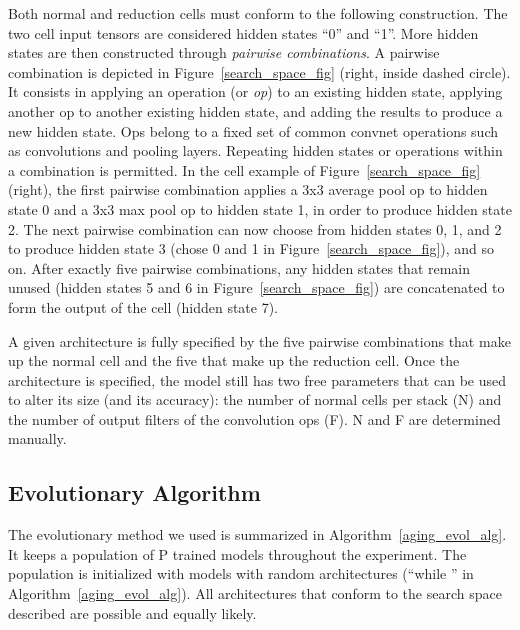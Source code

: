\documentclass[letterpaper]{article} \usepackage{aaai19}  \usepackage{times}  \usepackage{helvet}  \usepackage{courier}  \usepackage{graphicx}  \frenchspacing
\begin{document}
Both normal and reduction cells must conform to the following construction. The two cell input tensors are considered hidden states ``0'' and ``1''. More hidden states are then constructed through \textit{pairwise combinations}. A pairwise combination is depicted in Figure~\ref{search_space_fig} (right, inside dashed circle). It consists in applying an operation (or \textit{op}) to an existing hidden state, applying another op to another existing hidden state, and adding the results to produce a new hidden state. Ops belong to a fixed set of common convnet operations such as convolutions and pooling layers. Repeating hidden states or operations within a combination is permitted. In the cell example of Figure~\ref{search_space_fig} (right), the first pairwise combination applies a 3x3 average pool op to hidden state 0 and a 3x3 max pool op to hidden state 1, in order to produce hidden state 2. The next pairwise combination can now choose from hidden states 0, 1, and 2 to produce hidden state 3 (chose 0 and 1 in Figure~\ref{search_space_fig}), and so on. After exactly five pairwise combinations, any hidden states that remain unused (hidden states 5 and 6 in Figure~\ref{search_space_fig}) are concatenated to form the output of the cell (hidden state 7).

A given architecture is fully specified by the five pairwise combinations that make up the normal cell and the five that make up the reduction cell. Once the architecture is specified, the model still has two free parameters that can be used to alter its size (and its accuracy): the number of normal cells per stack (N) and the number of output filters of the convolution ops (F). N and F are determined manually.


\subsection{Evolutionary Algorithm}


The evolutionary method we used is summarized in Algorithm~\ref{aging_evol_alg}. It keeps a population of P trained models throughout the experiment. The population is initialized with models with random architectures (``{while }'' in Algorithm~\ref{aging_evol_alg}). All architectures that conform to the search space described are possible and equally likely.
\end{document}
